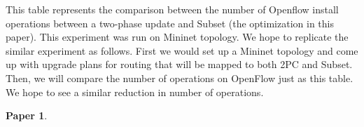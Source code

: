 \documentclass[11pt]{article}
\newtheorem{pb}{Paper}
\begin{document}
This table represents the comparison between the number of Openflow install operations between a two-phase update and Subset (the optimization in this paper). This experiment was run on Mininet topology. We hope to replicate the similar experiment as follows. First we would set up a Mininet topology and come up with upgrade plans for routing that will be mapped to both 2PC and Subset. Then, we will compare the number of operations on OpenFlow just as this table. We hope to see a similar reduction in number of operations.

\newpage
\begin{pb}

\end{pb}
\end{document}
